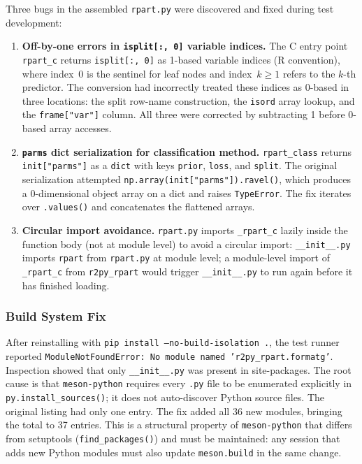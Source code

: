 \documentclass[12pt]{article}
\begin{document}
Three bugs in the assembled \texttt{rpart.py} were discovered and fixed during test development:
\begin{enumerate}
\item \textbf{Off-by-one errors in \texttt{isplit[:, 0]} variable indices.} The C entry point \texttt{rpart\_c} returns \texttt{isplit[:, 0]} as 1-based variable indices (R convention), where index~0 is the sentinel for leaf nodes and index~$k \geq 1$ refers to the $k$-th predictor. The conversion had incorrectly treated these indices as 0-based in three locations: the split row-name construction, the \texttt{isord} array lookup, and the \texttt{frame["var"]} column. All three were corrected by subtracting 1 before 0-based array accesses.
\item \textbf{\texttt{parms} dict serialization for classification method.} \texttt{rpart\_class} returns \texttt{init["parms"]} as a \texttt{dict} with keys \texttt{prior}, \texttt{loss}, and \texttt{split}. The original serialization attempted \texttt{np.array(init["parms"]).ravel()}, which produces a 0-dimensional object array on a dict and raises \texttt{TypeError}. The fix iterates over \texttt{.values()} and concatenates the flattened arrays.
\item \textbf{Circular import avoidance.} \texttt{rpart.py} imports \texttt{\_rpart\_c} lazily inside the function body (not at module level) to avoid a circular import: \texttt{\_\_init\_\_.py} imports \texttt{rpart} from \texttt{rpart.py} at module level; a module-level import of \texttt{\_rpart\_c} from \texttt{r2py\_rpart} would trigger \texttt{\_\_init\_\_.py} to run again before it has finished loading.
\end{enumerate}

\subsubsection{Build System Fix}

After reinstalling with \texttt{pip install --no-build-isolation .}, the test runner reported \texttt{ModuleNotFoundError: No module named 'r2py\_rpart.formatg'}. Inspection showed that only \texttt{\_\_init\_\_.py} was present in site-packages. The root cause is that \texttt{meson-python} requires every \texttt{.py} file to be enumerated explicitly in \texttt{py.install\_sources()}; it does not auto-discover Python source files. The original listing had only one entry. The fix added all 36 new modules, bringing the total to 37 entries. This is a structural property of \texttt{meson-python} that differs from setuptools (\texttt{find\_packages()}) and must be maintained: any session that adds new Python modules must also update \texttt{meson.build} in the same change.
\end{document}
